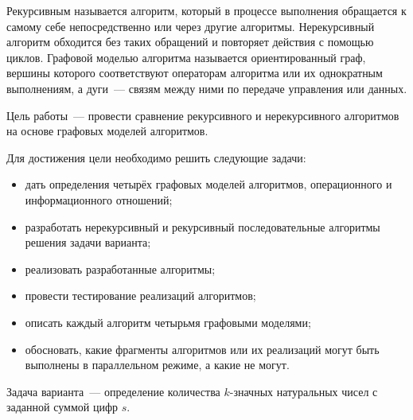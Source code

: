 
Рекурсивным называется алгоритм, который в процессе выполнения обращается
к самому себе непосредственно или через другие алгоритмы. Нерекурсивный
алгоритм обходится без таких обращений и повторяет действия с помощью циклов.
Графовой моделью алгоритма называется ориентированный граф, вершины которого
соответствуют операторам алгоритма или их однократным выполнениям,
а дуги~--- связям между ними по передаче управления или данных.

Цель работы~--- провести сравнение рекурсивного и нерекурсивного алгоритмов
на основе графовых моделей алгоритмов.

Для достижения цели необходимо решить следующие задачи:
\begin{itemize}
    \item дать определения четырёх графовых моделей алгоритмов,
    операционного и информационного отношений;
    \item разработать нерекурсивный и рекурсивный последовательные алгоритмы
    решения задачи варианта;
    \item реализовать разработанные алгоритмы;
    \item провести тестирование реализаций алгоритмов;
    \item описать каждый алгоритм четырьмя графовыми моделями;
    \item обосновать, какие фрагменты алгоритмов или их реализаций могут быть
    выполнены в параллельном режиме, а какие не могут.
\end{itemize}

Задача варианта~--- определение количества $k$-значных натуральных чисел
с заданной суммой цифр $s$.

